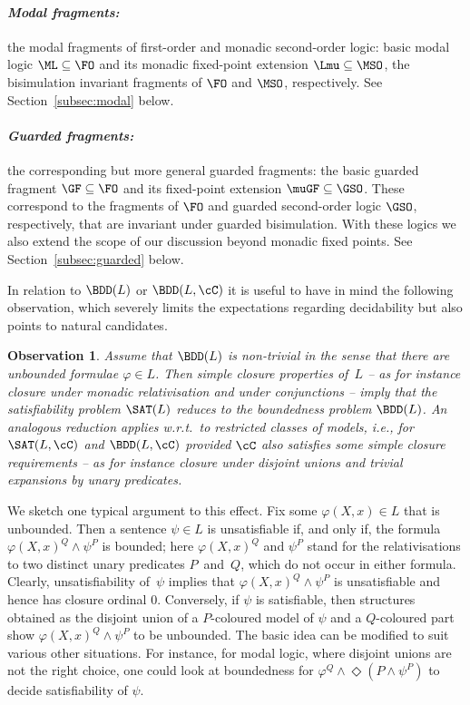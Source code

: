 \documentclass{LMCS}
\newtheorem{observation}[thm]{Observation}
\begin{document}
\paragraph*{\textit{Modal fragments:}}
the modal fragments of first-order and monadic second-order logic\?:
basic modal logic $\ML \subseteq \FO$ and its monadic fixed-point extension
$\Lmu \subseteq \MSO$, the bisimulation invariant
fragments of $\FO$ and $\MSO$, respectively.
See Section~\ref{subsec:modal} below.

\paragraph*{\textit{Guarded fragments:}} the corresponding but more general guarded fragments\?:
the basic guarded fragment $\GF \subseteq \FO$ and its fixed-point extension
$\muGF \subseteq \GSO$. These correspond to the fragments of
$\FO$ and guarded second-order logic $\GSO$, respectively,
that are invariant under guarded bisimulation.
With these logics we also
extend the scope of our discussion beyond monadic fixed points.
See Section~\ref{subsec:guarded} below.

\smallskip
In relation to $\BDD(L)$ or $\BDD(L,\cC)$ it is useful
to have in mind the following observation, which severely limits
the expectations regarding decidability but also points to
natural candidates.

\begin{observation}\label{obs:SAT vs BDD}
Assume that $\BDD(L)$ is non-trivial in the sense
that there are unbounded formulae $\varphi \in L$.
Then simple closure properties of~$L$ -- as for instance
closure under monadic relativisation and under conjunctions --
imply that the satisfiability problem $\SAT(L)$
reduces to the boundedness problem $\BDD(L)$.
An analogous reduction applies w.r.t.\ to restricted classes of models, i.e.,
for $\SAT(L,\cC)$ and $\BDD(L,\cC)$ provided
$\cC$ also satisfies some simple closure requirements --
as for instance closure under disjoint unions and trivial expansions by unary
predicates.
\end{observation}


We sketch one typical argument to this effect.
Fix some $\varphi(X,x) \in L$ that is unbounded.
Then a sentence
$\psi \in L$ is unsatisfiable if, and only if,
the formula $\varphi(X,x)^Q \wedge \psi^P$ is bounded\?;
here $\varphi(X,x)^Q$ and $\psi^P$ stand for the relativisations
to two distinct unary predicates $P$~and~$Q$,
which do not occur in either formula.
Clearly, unsatisfiability of~$\psi$ implies that
$\varphi(X,x)^Q \wedge \psi^P$ is unsatisfiable and hence
has closure ordinal $0$. Conversely, if $\psi$ is satisfiable, then
structures obtained as the disjoint union of a $P$-coloured model
of $\psi$ and a $Q$-coloured part show $\varphi(X,x)^Q \wedge \psi^P$
to be unbounded. The basic idea can be
modified to suit various other situations. For instance, for modal logic,
where disjoint unions are not the right choice,
one could look at boundedness for $\varphi^Q \wedge
\Diamond (P \wedge \psi^P)$ to decide satisfiability of $\psi$.
\end{document}
